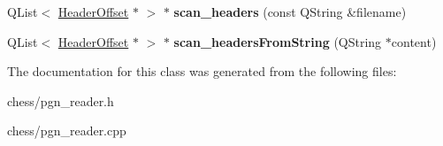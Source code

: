 \begin{DoxyCompactItemize}
\item 
\hypertarget{classchess_1_1PgnReader_ad60589467dafb5fb1c70d3486fd56769}{Q\-List$<$ \hyperlink{structchess_1_1HeaderOffset}{Header\-Offset} $\ast$ $>$ $\ast$ {\bfseries scan\-\_\-headers} (const Q\-String \&filename)}\label{classchess_1_1PgnReader_ad60589467dafb5fb1c70d3486fd56769}

\item 
\hypertarget{classchess_1_1PgnReader_ad7b5586d16e1922a186d1b10c3416187}{Q\-List$<$ \hyperlink{structchess_1_1HeaderOffset}{Header\-Offset} $\ast$ $>$ $\ast$ {\bfseries scan\-\_\-headers\-From\-String} (Q\-String $\ast$content)}\label{classchess_1_1PgnReader_ad7b5586d16e1922a186d1b10c3416187}

\end{DoxyCompactItemize}


The documentation for this class was generated from the following files\-:\begin{DoxyCompactItemize}
\item 
chess/pgn\-\_\-reader.\-h\item 
chess/pgn\-\_\-reader.\-cpp\end{DoxyCompactItemize}
